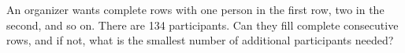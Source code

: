 An organizer wants complete rows with one person in the first row, two in the second, and so on. There are 134 participants. Can they fill complete consecutive rows, and if not, what is the smallest number of additional participants needed?
